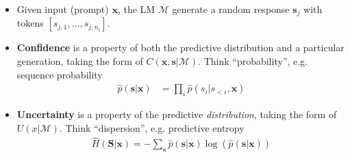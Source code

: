 \begin{block}{\color{mydarkgreen}{Uncertainty vs Confidence}}

\begin{itemize}
    \item 
    Given input (prompt) $\mathbf{x}$, the LM $\mathcal{M}$ generate a random response  $\mathbf{s}_j$ with tokens $[s_{j,1},\ldots,s_{j,n_i}]$.
    
    \item \textbf{Confidence} is a property of both the predictive distribution and a particular generation, taking the form of $C(\mathbf{x},\mathbf{s}|\mathcal{M})$.
    Think ``probability'', e.g. sequence probability %
    \begin{align}
        \hat{p}(\mathbf{s}|\mathbf{x}) &= \prod_{i} \hat{p}(s_i | s_{<i}, \mathbf{x}) \label{eq:jointproba}
    \end{align}
    
    \item \textbf{Uncertainty} is a property of the predictive \textit{distribution}, taking the form of $U(x|\mathcal{M})$. 
    Think  ``dispersion'', e.g. predictive entropy
    \begin{align}
        \hat{H}(\mathbf{S}|\mathbf{x}) = 
    -\sum_{\mathbf{s}} \hat{p}(\mathbf{s}|\mathbf{x}) \log{(\hat{p}(\mathbf{s}|\mathbf{x}))} \label{eq:entropy:nlg}
    \end{align}

    
\end{itemize}
\end{block}



